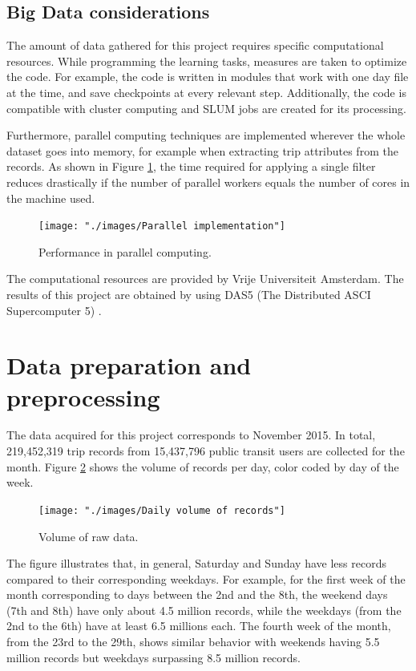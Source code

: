 \documentclass{article}
\begin{document}
\subsection{Big Data considerations}
The amount of data gathered for this project requires specific computational resources. While programming the learning tasks, measures are taken to optimize the code. For example, the code is written in modules that work with one day file at the time, and save checkpoints at every relevant step. Additionally, the code is compatible with cluster computing and SLUM jobs are created for its processing.

Furthermore, parallel computing techniques are implemented wherever the whole dataset goes into memory, for example when extracting trip attributes from the records. As shown in Figure \ref{fig:bigdata/parallel}, the time required for applying a single filter reduces drastically if the number of parallel workers equals the number of cores in the machine used. 

\begin{figure}[H]
  \centering
  \texttt{[image: "./images/Parallel implementation"]}
  \caption{Performance in parallel computing.}
  \label{fig:bigdata/parallel}
\end{figure}

The computational resources are provided by Vrije Universiteit Amsterdam. The results of this project are obtained by using DAS5 (The Distributed ASCI Supercomputer 5) \cite{bal2016medium}. 

\newpage
\section{Data preparation and preprocessing}
\label{sec:partI}
The data acquired for this project corresponds to November 2015. In total, 219,452,319 trip records from 15,437,796 public transit users are collected for the month. Figure \ref{fig:preprocessing/volume} shows the volume of records per day, color coded by day of the week. 

\begin{figure}[H]
  \centering
  \texttt{[image: "./images/Daily volume of records"]}
  \caption{Volume of raw data.}
  \label{fig:preprocessing/volume}
\end{figure}

The figure illustrates that, in general, Saturday and Sunday have less records compared to their corresponding weekdays. For example, for the first week of the month corresponding to days between the 2nd and the 8th, the weekend days (7th and 8th) have only about 4.5 million records, while the weekdays (from the 2nd to the 6th) have at least 6.5 millions each. The fourth week of the month, from the 23rd to the 29th, shows similar behavior with weekends having 5.5 million records but weekdays surpassing 8.5 million records.
\end{document}
